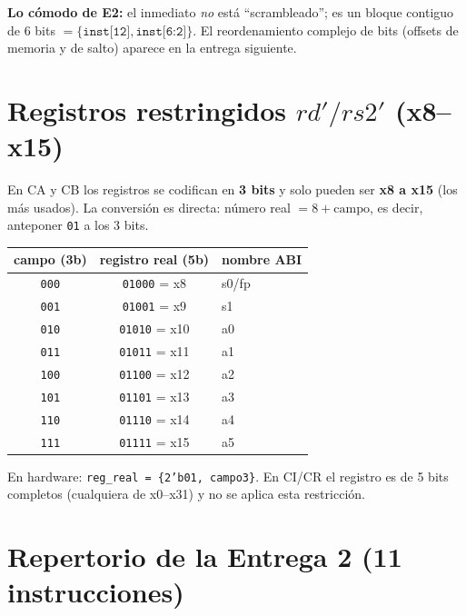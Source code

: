 \documentclass[11pt]{article}
\newcommand{\code}[1]{\texttt{#1}}
\begin{document}
\noindent
\textbf{Lo cómodo de E2:} el inmediato \emph{no} está ``scrambleado''; es un bloque
contiguo de 6 bits $=\{\code{inst[12]}, \code{inst[6:2]}\}$. El reordenamiento
complejo de bits (offsets de memoria y de salto) aparece en la entrega
siguiente.

\section{Registros restringidos \texorpdfstring{$rd'/rs2'$}{rd'/rs2'} (x8--x15)}

En CA y CB los registros se codifican en \textbf{3 bits} y solo pueden ser
\textbf{x8 a x15} (los más usados). La conversión es directa: número real
$= 8 + \text{campo}$, es decir, anteponer \code{01} a los 3 bits.

\begin{center}
\small
\begin{tabular}{@{}ccl@{}}
\toprule
campo (3b) & registro real (5b) & nombre ABI \\
\midrule
\code{000} & \code{01000} = x8  & s0/fp \\
\code{001} & \code{01001} = x9  & s1 \\
\code{010} & \code{01010} = x10 & a0 \\
\code{011} & \code{01011} = x11 & a1 \\
\code{100} & \code{01100} = x12 & a2 \\
\code{101} & \code{01101} = x13 & a3 \\
\code{110} & \code{01110} = x14 & a4 \\
\code{111} & \code{01111} = x15 & a5 \\
\bottomrule
\end{tabular}
\end{center}

\noindent
En hardware: \code{reg\_real = \{2'b01, campo3\}}. En CI/CR el registro es de 5
bits completos (cualquiera de x0--x31) y no se aplica esta restricción.

\section{Repertorio de la Entrega 2 (11 instrucciones)}
\end{document}
